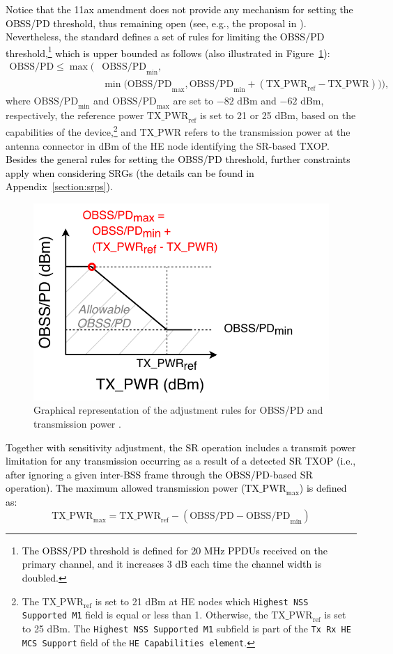 \documentclass[preprint,12pt]{elsarticle}
\theoremstyle{plain}
\begin{document}
\textcolor{black}{Notice that the 11ax amendment does not provide any mechanism for setting the OBSS/PD threshold, thus remaining open (see, e.g., the proposal in \cite{tgax2016obss_pd_evaluation}). Nevertheless, the standard defines a set of rules for limiting the OBSS/PD threshold,\footnote{\textcolor{black}{The $\text{OBSS/PD}$ threshold is defined for 20 MHz PPDUs received on the primary channel, and it increases 3 dB each time the channel width is doubled.}} which is upper bounded as follows (also illustrated in Figure~\ref{fig:fig_7}):}
\begin{align}\nonumber \text{OBSS/PD} \leq  \max\Big(&\text{OBSS/PD}_{\min},\\ &  \min\big(\text{OBSS/PD}_{\max},\text{OBSS/PD}_{\min} + (\text{TX\_PWR}_{\text{ref}}-\text{TX\_PWR})\big)\Big), \nonumber \end{align}
where $\text{OBSS/PD}_{\min}$ and $\text{OBSS/PD}_{\max}$ are set to $-82$ dBm and $-62$ dBm, respectively, the reference power $\text{TX\_PWR}_{\text{ref}}$ is set to 21 or 25 dBm, based on the
capabilities of the device,\footnote{The $\text{TX\_PWR}_{\text{ref}}$ is set to 21 dBm at HE nodes which \texttt{Highest NSS Supported M1} field is equal or less than 1. Otherwise, the  $\text{TX\_PWR}_{\text{ref}}$ is set to 25 dBm. The \texttt{Highest NSS Supported M1} subfield is part of the \texttt{Tx Rx HE MCS Support} field of the \texttt{HE Capabilities element}.} and $\text{TX\_PWR}$ refers to the transmission power at the antenna connector in dBm of the HE node identifying the SR-based TXOP. \textcolor{black}{Besides the general rules for setting the OBSS/PD threshold, further constraints apply when considering SRGs (the details can be found in Appendix~\ref{section:srps}).}
\begin{figure}[ht!]
	\centering
	\includegraphics[width=0.4\columnwidth]{fig_10}
	\caption{Graphical representation of the adjustment rules for OBSS/PD and transmission power \cite{tgax2019draft}.}
	\label{fig:fig_7}
\end{figure}

\textcolor{black}{Together with sensitivity adjustment, the SR operation includes a transmit power limitation for any transmission occurring as a result of a detected SR TXOP (i.e., after ignoring a given inter-BSS frame through the OBSS/PD-based SR operation). The maximum allowed transmission power ($\text{TX\_PWR}_{\max}$) is defined as:}
\begin{equation}
\text{TX\_PWR}_{\max} = \text{TX\_PWR}_{\text{ref}} - (\text{OBSS/PD} -\text{OBSS/PD}_{\min})
\label{eq:power_restriction}
\end{equation}
\end{document}
